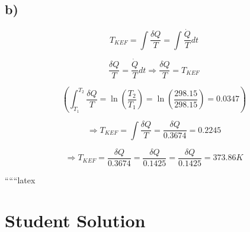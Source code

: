 

\subsection*{b)}

\[
T_{KEF} = \int \frac{\delta Q}{T} = \int \frac{\dot{Q}}{T} dt
\]

\[
\frac{\delta Q}{T} = \frac{\dot{Q}}{T} dt \Rightarrow \frac{\delta Q}{T} = T_{KEF}
\]

\[
\left( \int_{T_1}^{T_2} \frac{\delta Q}{T} = \ln \left( \frac{T_2}{T_1} \right) = \ln \left( \frac{298.15}{298.15} \right) = 0.0347 \right)
\]

\[
\Rightarrow T_{KEF} = \int \frac{\delta Q}{T} = \frac{\delta Q}{0.3674} = 0.2245
\]

\[
\Rightarrow T_{KEF} = \frac{\delta Q}{0.3674} = \frac{\delta Q}{0.1425} = \frac{\delta Q}{0.1425} = 373.86 K
\]

``````latex


\section*{Student Solution}